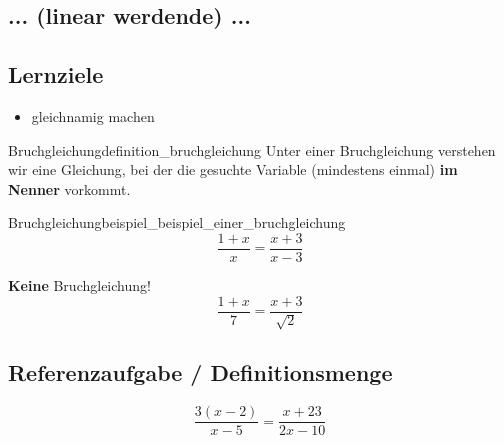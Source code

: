
\subsection{... (linear werdende) ...}




\subsection*{Lernziele}

\begin{itemize}
	\item gleichnamig machen
\end{itemize}

\begin{definition}{Bruchgleichung}{definition_bruchgleichung}
  Unter einer Bruchgleichung verstehen wir eine Gleichung, bei der die
  gesuchte Variable (mindestens einmal) \textbf{im Nenner} vorkommt.
\end{definition}

\begin{beispiel}{Bruchgleichung}{beispiel_beispiel_einer_bruchgleichung}
$$\frac{1+x}{x}=\frac{x+3}{x-3}$$
\end{beispiel}

\begin{bemerkung}{\textbf{Keine} Bruchgleichung!}{}
  $$\frac{1+x}7=\frac{x+3}{\sqrt{2}}$$
\end{bemerkung}
\newpage

\subsection{Referenzaufgabe / Definitionsmenge}

$$\frac{3(x-2)}{x-5} = \frac{x+23}{2x-10}$$

